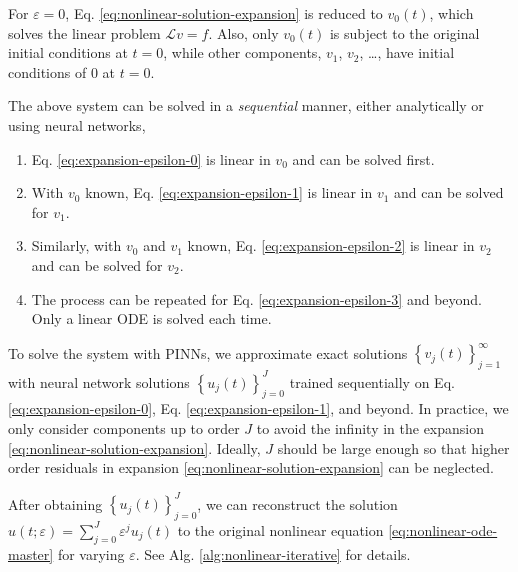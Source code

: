 \documentclass[accepted]{uai2023}
\renewcommand{\L}{\mathcal{L}}
\begin{document}
    \vspace{-1em}
    For $\varepsilon = 0$, Eq. \ref{eq:nonlinear-solution-expansion} is reduced to $v_0(t)$, which solves the linear problem $\L v=f$. 
    Also, only $v_0(t)$ is subject to the original initial conditions at $t=0$, while other components, $v_1$, $v_2$, \dots, have initial conditions of $0$ at $t=0$.

    The above system can be solved in a \textit{sequential} manner, either analytically or using neural networks,
    \begin{enumerate}
        \item Eq. \ref{eq:expansion-epsilon-0} is linear in $v_0$ and can be solved first. 
        \item With $v_0$ known, Eq. \ref{eq:expansion-epsilon-1} is linear in $v_1$ and can be solved for $v_1$. 
        \item Similarly, with $v_0$ and $v_1$ known, Eq. \ref{eq:expansion-epsilon-2} is linear in $v_2$ and can be solved for $v_2$.
        \item The process can be repeated for Eq. \ref{eq:expansion-epsilon-3} and beyond. Only a linear ODE is solved each time.
    \end{enumerate}
    To solve the system with PINNs, we approximate exact solutions $\left\{v_j(t)\right\}_{j=1}^{\infty}$ with neural network solutions $\left\{u_j(t)\right\}_{j=0}^{J}$ trained sequentially on Eq. \ref{eq:expansion-epsilon-0}, Eq. \ref{eq:expansion-epsilon-1}, and beyond. 
    In practice, we only consider components up to order $J$ to avoid the infinity in the expansion \ref{eq:nonlinear-solution-expansion}. 
    Ideally, $J$ should be large enough so that higher order residuals in expansion \ref{eq:nonlinear-solution-expansion} can be neglected.

    After obtaining $\left\{u_j(t)\right\}_{j=0}^{J}$, we can reconstruct the solution $u(t;\varepsilon) = \sum_{j=0}^{J} \varepsilon^j u_j(t)$ to the original nonlinear equation \ref{eq:nonlinear-ode-master} for varying $\varepsilon$.
    See Alg. \ref{alg:nonlinear-iterative} for details.
\end{document}
